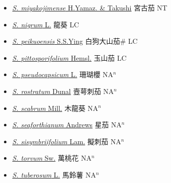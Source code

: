 \begin{itemize}
\begin{itemize}
        \item[] \href{http://www.theplantlist.org/tpl1.1/search?q=Solanum+miyakojimense}{\textit{S. miyakojimense} H.Yamaz. \& Takushi}   宮古茄 NT
        \item[] \href{http://www.theplantlist.org/tpl1.1/search?q=Solanum+nigrum}{\textit{S. nigrum} L.}   龍葵 LC
        \item[] \href{http://www.theplantlist.org/tpl1.1/search?q=Solanum+peikuoensis}{\textit{S. peikuoensis} S.S.Ying}   白狗大山茄\# LC
        \item[] \href{http://www.theplantlist.org/tpl1.1/search?q=Solanum+pittosporifolium}{\textit{S. pittosporifolium} Hemsl.}   玉山茄 LC
        \item[] \href{http://www.theplantlist.org/tpl1.1/search?q=Solanum+pseudocapsicum}{\textit{S. pseudocapsicum} L.}   珊瑚櫻 NA$^n$
        \item[] \href{http://www.theplantlist.org/tpl1.1/search?q=Solanum+rostratum}{\textit{S. rostratum} Dunal}   壼萼刺茄 NA$^n$
        \item[] \href{http://www.theplantlist.org/tpl1.1/search?q=Solanum+scabrum}{\textit{S. scabrum} Mill.}   木龍葵 NA$^n$
        \item[] \href{http://www.theplantlist.org/tpl1.1/search?q=Solanum+seaforthianum}{\textit{S. seaforthianum} Andrews}   星茄 NA$^n$
        \item[] \href{http://www.theplantlist.org/tpl1.1/search?q=Solanum+sisymbriifolium}{\textit{S. sisymbriifolium} Lam.}   擬刺茄 NA$^n$
        \item[] \href{http://www.theplantlist.org/tpl1.1/search?q=Solanum+torvum}{\textit{S. torvum} Sw.}   萬桃花 NA$^n$
        \item[] \href{http://www.theplantlist.org/tpl1.1/search?q=Solanum+tuberosum}{\textit{S. tuberosum} L.}   馬鈴薯 NA$^n$

\end{itemize}
\end{itemize}
